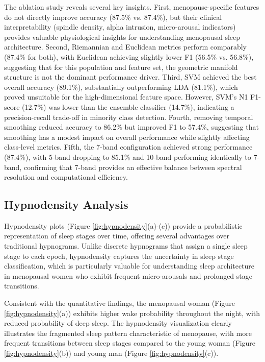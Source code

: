 \documentclass[a4paper,fleqn]{cas-dc}
\begin{document}
The ablation study reveals several key insights. First, menopause-specific features do not directly improve accuracy (87.5\% vs. 87.4\%), but their clinical interpretability (spindle density, alpha intrusion, micro-arousal indicators) provides valuable physiological insights for understanding menopausal sleep architecture. Second, Riemannian and Euclidean metrics perform comparably (87.4\% for both), with Euclidean achieving slightly lower F1 (56.5\% vs. 56.8\%), suggesting that for this population and feature set, the geometric manifold structure is not the dominant performance driver. Third, SVM achieved the best overall accuracy (89.1\%), substantially outperforming LDA (81.1\%), which proved unsuitable for the high-dimensional feature space. However, SVM's N1 F1-score (12.7\%) was lower than the ensemble classifier (14.7\%), indicating a precision-recall trade-off in minority class detection. Fourth, removing temporal smoothing reduced accuracy to 86.2\% but improved F1 to 57.4\%, suggesting that smoothing has a modest impact on overall performance while slightly affecting class-level metrics. Fifth, the 7-band configuration achieved strong performance (87.4\%), with 5-band dropping to 85.1\% and 10-band performing identically to 7-band, confirming that 7-band provides an effective balance between spectral resolution and computational efficiency.

\subsection{Hypnodensity Analysis}

Hypnodensity plots (Figure \ref{fig:hypnodensity}(a)-(c)) provide a probabilistic representation of sleep stages over time, offering several advantages over traditional hypnograms. Unlike discrete hypnograms that assign a single sleep stage to each epoch, hypnodensity captures the uncertainty in sleep stage classification, which is particularly valuable for understanding sleep architecture in menopausal women who exhibit frequent micro-arousals and prolonged stage transitions.

Consistent with the quantitative findings, the menopausal woman (Figure \ref{fig:hypnodensity}(a)) exhibits higher wake probability throughout the night, with reduced probability of deep sleep. The hypnodensity visualization clearly illustrates the fragmented sleep pattern characteristic of menopause, with more frequent transitions between sleep stages compared to the young woman (Figure \ref{fig:hypnodensity}(b)) and young man (Figure \ref{fig:hypnodensity}(c)).
\end{document}
